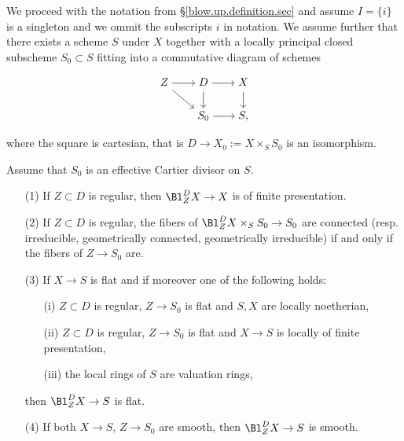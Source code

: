 \documentclass[10pt]{alggeom}
\theoremstyle{definition}
\numberwithin{equation}{section}
\begin{document}
We proceed with the notation from \S\ref{blow.up.definition.sec} and assume $I= \{i\}$ is a singleton and we ommit the subscripts $i$ in notation.
We assume further that there exists a scheme $S$ under $X$ together with a locally principal closed subscheme $S_0\subset S$ fitting into a commutative diagram of schemes
\begin{equation}\label{blow.up.smoothness.diag}
\begin{tikzpicture}[baseline=(current  bounding  box.center)]
\matrix(a)[matrix of math nodes, 
row sep=1.5em, column sep=2em, 
text height=1.5ex, text depth=0.45ex] 
{ 
Z& D& X \\ 
& S_0 & S,\\}; 
\path[->](a-1-1) edge node[above] {} (a-1-2);
\path[->](a-1-2) edge node[above] {} (a-1-3);
\path[->](a-2-2) edge node[above] {} (a-2-3);
\path[->](a-1-1) edge node[right] {} (a-2-2);
\path[->](a-1-2) edge node[right] {} (a-2-2);
\path[->](a-1-3) edge node[right] {} (a-2-3);
\end{tikzpicture}
\end{equation}
where the square is cartesian, that is $D\to X_0:=X\times_SS_0$
is an isomorphism.


 \label{blow.up.smoothness.prop}
Assume that $S_0$ is an effective Cartier divisor on $S$.
\begin{enumerate}
\item[(1)] If $Z\subset D$ is regular, then
$\Bl_Z^DX\to X$ is of finite presentation.
\item[(2)] If $Z\subset D$ is regular, the fibers of
$\Bl_Z^DX\times_SS_0\to S_0$ are connected \textup{(}resp.
irreducible, geometrically connected, geometrically irreducible\textup{)}
if and only if the fibers of $Z\to S_0$ are.
\item[(3)] If $X\to S$ is flat and if moreover one of the following holds:
\begin{itemize}
\item[\rm (i)] $Z\subset D$ is regular, $Z\to S_0$ is flat
and $S,X$ are locally noetherian,
\item[\rm (ii)] $Z\subset D$ is regular, $Z\to S_0$ is flat and
$X\to S$ is locally of finite presentation,
\item[\rm (iii)] the local rings of $S$ are valuation rings,
\end{itemize}
then $\Bl_Z^DX\to S$ is flat.
\item[(4)] If both $X\to S$, $Z\to S_0$ are smooth, then $\Bl_Z^DX\to S$ is smooth.
\end{enumerate}
\xprop
\end{document}
